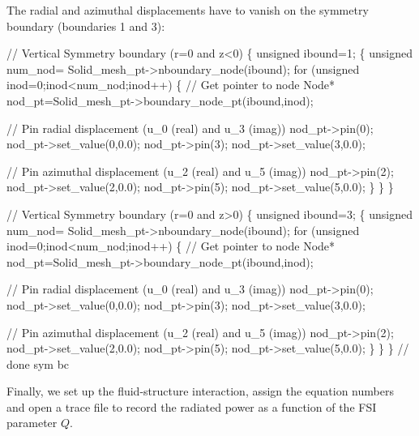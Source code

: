 The radial and azimuthal displacements have to vanish on the symmetry boundary (boundaries 1 and 3)\+:


\begin{DoxyCodeInclude}

 \textcolor{comment}{// Vertical Symmetry boundary (r=0 and z<0)}
 \{
  \textcolor{keywordtype}{unsigned} ibound=1;
  \{
   \textcolor{keywordtype}{unsigned} num\_nod= Solid\_mesh\_pt->nboundary\_node(ibound);
   \textcolor{keywordflow}{for} (\textcolor{keywordtype}{unsigned} inod=0;inod<num\_nod;inod++)
    \{
     \textcolor{comment}{// Get pointer to node}
     Node* nod\_pt=Solid\_mesh\_pt->boundary\_node\_pt(ibound,inod);
     
     \textcolor{comment}{// Pin radial displacement (u\_0 (real) and u\_3 (imag))}
     nod\_pt->pin(0);
     nod\_pt->set\_value(0,0.0);
     nod\_pt->pin(3);
     nod\_pt->set\_value(3,0.0);
     
     \textcolor{comment}{// Pin azimuthal displacement (u\_2 (real) and u\_5 (imag))}
     nod\_pt->pin(2);
     nod\_pt->set\_value(2,0.0);
     nod\_pt->pin(5);
     nod\_pt->set\_value(5,0.0);
    \}
  \}
 \}
 

 \textcolor{comment}{// Vertical Symmetry boundary (r=0 and z>0)}
 \{
  \textcolor{keywordtype}{unsigned} ibound=3;
  \{
   \textcolor{keywordtype}{unsigned} num\_nod= Solid\_mesh\_pt->nboundary\_node(ibound);
   \textcolor{keywordflow}{for} (\textcolor{keywordtype}{unsigned} inod=0;inod<num\_nod;inod++)
    \{
     \textcolor{comment}{// Get pointer to node}
     Node* nod\_pt=Solid\_mesh\_pt->boundary\_node\_pt(ibound,inod);
     
     \textcolor{comment}{// Pin radial displacement (u\_0 (real) and u\_3 (imag))}
     nod\_pt->pin(0);
     nod\_pt->set\_value(0,0.0);
     nod\_pt->pin(3);
     nod\_pt->set\_value(3,0.0);
     
     \textcolor{comment}{// Pin azimuthal displacement (u\_2 (real) and u\_5 (imag))}
     nod\_pt->pin(2);
     nod\_pt->set\_value(2,0.0);
     nod\_pt->pin(5);
     nod\_pt->set\_value(5,0.0);
    \}
  \}
 \} \textcolor{comment}{// done sym bc}

\end{DoxyCodeInclude}


Finally, we set up the fluid-\/structure interaction, assign the equation numbers and open a trace file to record the radiated power as a function of the F\+SI parameter $ Q $.


